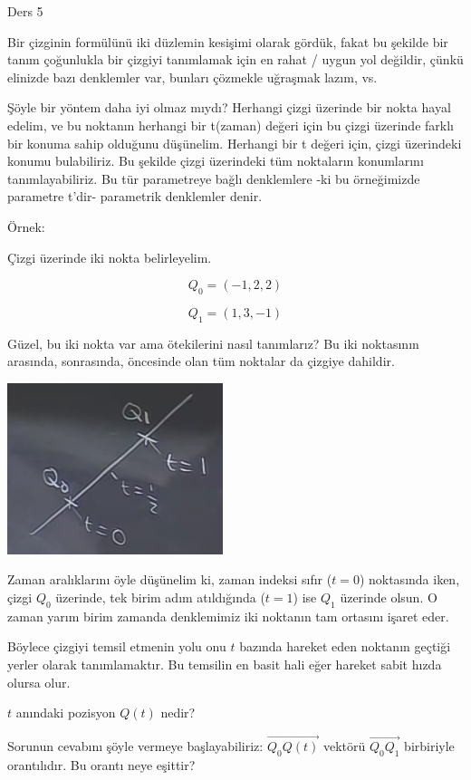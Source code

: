 \documentclass[12pt,fleqn]{article}\usepackage{../../common}
\begin{document}
Ders 5

Bir çizginin formülünü iki düzlemin kesişimi olarak gördük, fakat bu
şekilde bir tanım çoğunlukla bir çizgiyi tanımlamak için en rahat / uygun
yol değildir, çünkü elinizde bazı denklemler var, bunları çözmekle uğraşmak
lazım, vs. 

Şöyle bir yöntem daha iyi olmaz mıydı? Herhangi çizgi üzerinde bir nokta hayal 
edelim, ve bu noktanın herhangi bir t(zaman) değeri için bu çizgi üzerinde 
farklı bir konuma sahip olduğunu düşünelim. Herhangi bir t değeri için, çizgi 
üzerindeki konumu bulabiliriz. Bu şekilde çizgi üzerindeki tüm noktaların 
konumlarını tanımlayabiliriz. Bu tür parametreye bağlı denklemlere -ki bu 
örneğimizde parametre t'dir- parametrik denklemler denir. 

Örnek:

Çizgi üzerinde iki nokta belirleyelim. 

$$ Q_0 = (-1,2,2) $$

$$ Q_1 = (1,3,-1) $$

Güzel, bu iki nokta var ama ötekilerini nasıl tanımlarız? Bu iki noktasının
arasında, sonrasında, öncesinde olan tüm noktalar da çizgiye dahildir. 

\begin{center}
\includegraphics[height=5cm]{5_1.png}
\end{center}

Zaman aralıklarını öyle düşünelim ki, zaman indeksi sıfır ($t=0$) noktasında
iken, çizgi $Q_0$ üzerinde, tek birim adım atıldığında ($t=1$) ise $Q_1$
üzerinde olsun. O zaman yarım birim zamanda denklemimiz iki noktanın tam
ortasını işaret eder.

Böylece çizgiyi temsil etmenin yolu onu $t$ bazında hareket eden noktanın
geçtiği yerler olarak tanımlamaktır. Bu temsilin en basit hali eğer hareket
sabit hızda olursa olur. 

$t$ anındaki pozisyon $Q(t)$ nedir? 

Sorunun cevabını şöyle vermeye başlayabiliriz: $\vec{Q_0Q(t)}$ vektörü
$\vec{Q_0Q_1}$ birbiriyle orantılıdır. Bu orantı neye eşittir?
\end{document}
